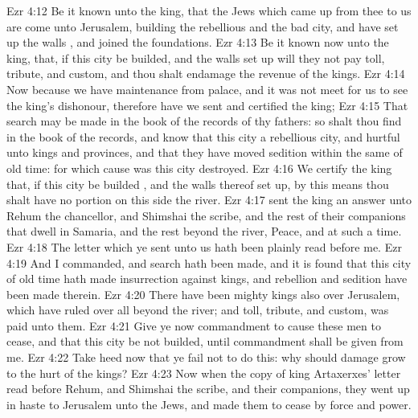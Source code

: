 \vs Ezr 4:12 Be it known unto the king, that the Jews which came up from thee to us are come unto Jerusalem, building the rebellious and the bad city, and have set up the walls , and joined the foundations.
\vs Ezr 4:13 Be it known now unto the king, that, if this city be builded, and the walls set up  will they not pay toll, tribute, and custom, and  thou shalt endamage the revenue of the kings.
\vs Ezr 4:14 Now because we have maintenance from  palace, and it was not meet for us to see the king's dishonour, therefore have we sent and certified the king;
\vs Ezr 4:15 That search may be made in the book of the records of thy fathers: so shalt thou find in the book of the records, and know that this city  a rebellious city, and hurtful unto kings and provinces, and that they have moved sedition within the same of old time: for which cause was this city destroyed.
\vs Ezr 4:16 We certify the king that, if this city be builded , and the walls thereof set up, by this means thou shalt have no portion on this side the river.
\vs Ezr 4:17  sent the king an answer unto Rehum the chancellor, and  Shimshai the scribe, and  the rest of their companions that dwell in Samaria, and  the rest beyond the river, Peace, and at such a time.
\vs Ezr 4:18 The letter which ye sent unto us hath been plainly read before me.
\vs Ezr 4:19 And I commanded, and search hath been made, and it is found that this city of old time hath made insurrection against kings, and  rebellion and sedition have been made therein.
\vs Ezr 4:20 There have been mighty kings also over Jerusalem, which have ruled over all  beyond the river; and toll, tribute, and custom, was paid unto them.
\vs Ezr 4:21 Give ye now commandment to cause these men to cease, and that this city be not builded, until  commandment shall be given from me.
\vs Ezr 4:22 Take heed now that ye fail not to do this: why should damage grow to the hurt of the kings?
\vs Ezr 4:23 Now when the copy of king Artaxerxes' letter  read before Rehum, and Shimshai the scribe, and their companions, they went up in haste to Jerusalem unto the Jews, and made them to cease by force and power.
